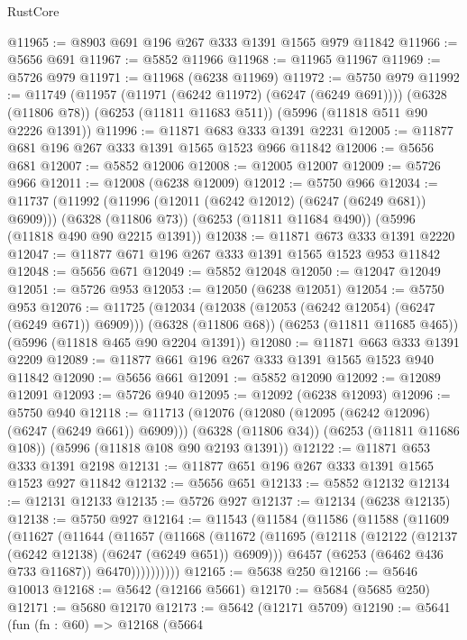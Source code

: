 \begin{lexlean}{RustCore}
\begin{coremodule}
@11965 := @8903 @691 @196 @267 @333 @1391 @1565 @979 @11842
@11966 := @5656 @691
@11967 := @5852 @11966
@11968 := @11965 @11967
@11969 := @5726 @979
@11971 := @11968 (@6238 @11969)
@11972 := @5750 @979
@11992 := @11749
    (@11957 (@11971 (@6242 @11972) (@6247 (@6249 @691))))
    (@6328 (@11806 @78))
    (@6253 (@11811 @11683 @511))
    (@5996 (@11818 @511 @90 @2226 @1391))
@11996 := @11871 @683 @333 @1391 @2231
@12005 := @11877 @681 @196 @267 @333 @1391 @1565 @1523 @966 @11842
@12006 := @5656 @681
@12007 := @5852 @12006
@12008 := @12005 @12007
@12009 := @5726 @966
@12011 := @12008 (@6238 @12009)
@12012 := @5750 @966
@12034 := @11737
    (@11992 (@11996 (@12011 (@6242 @12012) (@6247 (@6249 @681)) @6909)))
    (@6328 (@11806 @73))
    (@6253 (@11811 @11684 @490))
    (@5996 (@11818 @490 @90 @2215 @1391))
@12038 := @11871 @673 @333 @1391 @2220
@12047 := @11877 @671 @196 @267 @333 @1391 @1565 @1523 @953 @11842
@12048 := @5656 @671
@12049 := @5852 @12048
@12050 := @12047 @12049
@12051 := @5726 @953
@12053 := @12050 (@6238 @12051)
@12054 := @5750 @953
@12076 := @11725
    (@12034 (@12038 (@12053 (@6242 @12054) (@6247 (@6249 @671)) @6909)))
    (@6328 (@11806 @68))
    (@6253 (@11811 @11685 @465))
    (@5996 (@11818 @465 @90 @2204 @1391))
@12080 := @11871 @663 @333 @1391 @2209
@12089 := @11877 @661 @196 @267 @333 @1391 @1565 @1523 @940 @11842
@12090 := @5656 @661
@12091 := @5852 @12090
@12092 := @12089 @12091
@12093 := @5726 @940
@12095 := @12092 (@6238 @12093)
@12096 := @5750 @940
@12118 := @11713
    (@12076 (@12080 (@12095 (@6242 @12096) (@6247 (@6249 @661)) @6909)))
    (@6328 (@11806 @34))
    (@6253 (@11811 @11686 @108))
    (@5996 (@11818 @108 @90 @2193 @1391))
@12122 := @11871 @653 @333 @1391 @2198
@12131 := @11877 @651 @196 @267 @333 @1391 @1565 @1523 @927 @11842
@12132 := @5656 @651
@12133 := @5852 @12132
@12134 := @12131 @12133
@12135 := @5726 @927
@12137 := @12134 (@6238 @12135)
@12138 := @5750 @927
@12164 := @11543
    (@11584
      (@11586
        (@11588
          (@11609
            (@11627
              (@11644
                (@11657
                  (@11668
                    (@11672
                      (@11695
                        (@12118 (@12122 (@12137 (@6242 @12138) (@6247 (@6249 @651)) @6909)))
                        @6457
                        (@6253 (@6462 @436 @733 @11687))
                        @6470))))))))))
@12165 := @5638 @250
@12166 := @5646 @10013
@12168 := @5642 (@12166 @5661)
@12170 := @5684 (@5685 @250)
@12171 := @5680 @12170
@12173 := @5642 (@12171 @5709)
@12190 := @5641
    (fun (fn : @60) =>
    @12168
      (@5664

\end{coremodule}
\end{lexlean}
